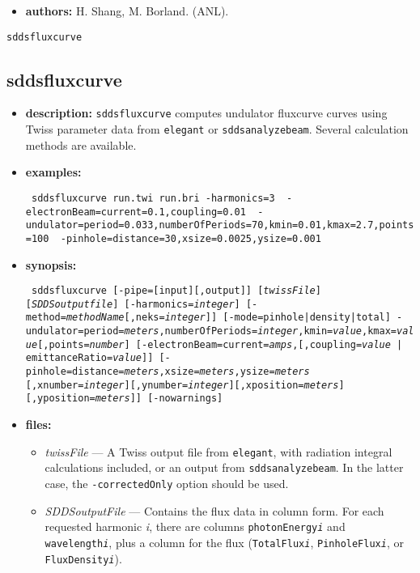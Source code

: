 \documentclass[11pt]{article}
\begin{document}
\begin{itemize}
\item {\bf authors:} H. Shang, M. Borland. (ANL).
\end{itemize}

\newpage
\begin{center}{\Large\verb|sddsfluxcurve|}\end{center}
\subsection{sddsfluxcurve}

\begin{itemize}
\item {\bf description:} {\tt sddsfluxcurve} computes undulator fluxcurve curves using
Twiss parameter data from {\tt elegant} or {\tt sddsanalyzebeam}. Several calculation
methods are available.

\item {\bf examples:}
\begin{flushleft}{\tt
sddsfluxcurve run.twi run.bri -harmonics=3 \
  -electronBeam=current=0.1,coupling=0.01 \
  -undulator=period=0.033,numberOfPeriods=70,kmin=0.01,kmax=2.7,points=100 \
  -pinhole=distance=30,xsize=0.0025,ysize=0.001 
}\end{flushleft}

\item {\bf synopsis:}
\begin{flushleft}{\tt
sddsfluxcurve [-pipe=[input][,output]] [{\em twissFile}] [{\em SDDSoutputfile}]
    [-harmonics={\em integer}] [-method={\em methodName}[,neks={\em integer}]]
    [-mode={pinhole|density|total}]
    -undulator=period={\em meters},numberOfPeriods={\em integer},kmin={\em value},kmax={\em value}[,points={\em number}]
    [-electronBeam=current={\em amps},[,{coupling={\em value} | emittanceRatio={\em value}}]]
    [-pinhole=distance={\em meters},xsize={\em meters},ysize={\em meters}
    [,xnumber={\em integer}][,ynumber={\em integer}][,xposition={\em meters}][,yposition={\em meters}]]
    [-nowarnings]
}\end{flushleft}

\item {\bf files:}
\begin{itemize}
\item {\em twissFile} --- A Twiss output file from {\tt elegant}, with radiation integral 
calculations included, or an output from {\tt sddsanalyzebeam}. In the latter case, the
{\tt -correctedOnly} option should be used.
\item {\em SDDSoutputFile} --- Contains the flux data in column form.  For each 
requested harmonic {\em i}, there are columns {\tt photonEnergy{\em i}} and {\tt wavelength{\em i}},
plus a column for the flux ({\tt TotalFlux{\em i}}, {\tt PinholeFlux{\em i}}, or {\tt FluxDensity{\em i}}).
\end{itemize}


\end{itemize}
\end{document}
